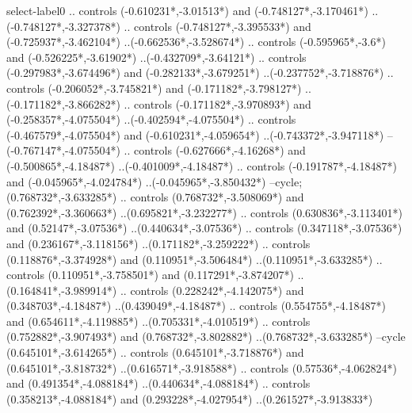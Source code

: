 {\begin{scope}[x=1mm,y=1mm,line width=\SCstroke mm,line cap=round,line join=round]
\begin{SCpart}{select-label0}
.. controls ({-0.610231*\SCF},{-3.01513*\SCF}) and ({-0.748127*\SCF},{-3.170461*\SCF}) ..({-0.748127*\SCF},{-3.327378*\SCF})
.. controls ({-0.748127*\SCF},{-3.395533*\SCF}) and ({-0.725937*\SCF},{-3.462104*\SCF}) ..({-0.662536*\SCF},{-3.528674*\SCF})
.. controls ({-0.595965*\SCF},{-3.6*\SCF}) and ({-0.526225*\SCF},{-3.61902*\SCF}) ..({-0.432709*\SCF},{-3.64121*\SCF})
.. controls ({-0.297983*\SCF},{-3.674496*\SCF}) and ({-0.282133*\SCF},{-3.679251*\SCF}) ..({-0.237752*\SCF},{-3.718876*\SCF})
.. controls ({-0.206052*\SCF},{-3.745821*\SCF}) and ({-0.171182*\SCF},{-3.798127*\SCF}) ..({-0.171182*\SCF},{-3.866282*\SCF})
.. controls ({-0.171182*\SCF},{-3.970893*\SCF}) and ({-0.258357*\SCF},{-4.075504*\SCF}) ..({-0.402594*\SCF},{-4.075504*\SCF})
.. controls ({-0.467579*\SCF},{-4.075504*\SCF}) and ({-0.610231*\SCF},{-4.059654*\SCF}) ..({-0.743372*\SCF},{-3.947118*\SCF})
--({-0.767147*\SCF},{-4.075504*\SCF})
.. controls ({-0.627666*\SCF},{-4.16268*\SCF}) and ({-0.500865*\SCF},{-4.18487*\SCF}) ..({-0.401009*\SCF},{-4.18487*\SCF})
.. controls ({-0.191787*\SCF},{-4.18487*\SCF}) and ({-0.045965*\SCF},{-4.024784*\SCF}) ..({-0.045965*\SCF},{-3.850432*\SCF})
--cycle;
 ({0.768732*\SCF},{-3.633285*\SCF})
.. controls ({0.768732*\SCF},{-3.508069*\SCF}) and ({0.762392*\SCF},{-3.360663*\SCF}) ..({0.695821*\SCF},{-3.232277*\SCF})
.. controls ({0.630836*\SCF},{-3.113401*\SCF}) and ({0.52147*\SCF},{-3.07536*\SCF}) ..({0.440634*\SCF},{-3.07536*\SCF})
.. controls ({0.347118*\SCF},{-3.07536*\SCF}) and ({0.236167*\SCF},{-3.118156*\SCF}) ..({0.171182*\SCF},{-3.259222*\SCF})
.. controls ({0.118876*\SCF},{-3.374928*\SCF}) and ({0.110951*\SCF},{-3.506484*\SCF}) ..({0.110951*\SCF},{-3.633285*\SCF})
.. controls ({0.110951*\SCF},{-3.758501*\SCF}) and ({0.117291*\SCF},{-3.874207*\SCF}) ..({0.164841*\SCF},{-3.989914*\SCF})
.. controls ({0.228242*\SCF},{-4.142075*\SCF}) and ({0.348703*\SCF},{-4.18487*\SCF}) ..({0.439049*\SCF},{-4.18487*\SCF})
.. controls ({0.554755*\SCF},{-4.18487*\SCF}) and ({0.654611*\SCF},{-4.119885*\SCF}) ..({0.705331*\SCF},{-4.010519*\SCF})
.. controls ({0.752882*\SCF},{-3.907493*\SCF}) and ({0.768732*\SCF},{-3.802882*\SCF}) ..({0.768732*\SCF},{-3.633285*\SCF})
--cycle
({0.645101*\SCF},{-3.614265*\SCF})
.. controls ({0.645101*\SCF},{-3.718876*\SCF}) and ({0.645101*\SCF},{-3.818732*\SCF}) ..({0.616571*\SCF},{-3.918588*\SCF})
.. controls ({0.57536*\SCF},{-4.062824*\SCF}) and ({0.491354*\SCF},{-4.088184*\SCF}) ..({0.440634*\SCF},{-4.088184*\SCF})
.. controls ({0.358213*\SCF},{-4.088184*\SCF}) and ({0.293228*\SCF},{-4.027954*\SCF}) ..({0.261527*\SCF},{-3.913833*\SCF})

\end{SCpart}
\end{scope}}
